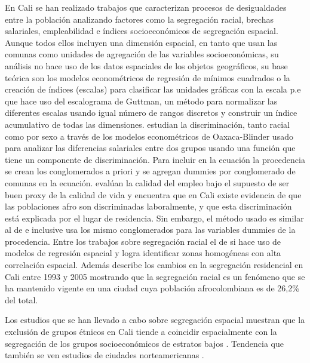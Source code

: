 \documentclass[12pt,]{book}
\begin{document}
En Cali se han realizado trabajos que caracterizan procesos de
desigualdades entre la población analizando factores como la segregación
racial, brechas salariales, empleabilidad e índices socioeconómicos de
segregación
espacial\citep{arroyo_mina_afrocolombianos_2016, mora_brechas_2014, ceron_indice_2014}.
Aunque todos ellos incluyen una dimensión espacial, en tanto que usan
las comunas como unidades de agregación de las variables
socioeconómicas, su análisis no hace uso de los datos espaciales de los
objetos geográficos, su base teórica son los modelos econométricos de
regresión de mínimos cuadrados o la creación de índices (escalas) para
clasificar las unidades gráficas con la escala p.e
\citep{ceron_indice_2014} que hace uso del escalograma de Guttman, un
método para normalizar las diferentes escalas usando igual número de
rangos discretos y construir un índice acumulativo de todas las
dimensiones. \citet{mora_brechas_2014} estudian la discriminación, tanto
racial como por sexo a través de los modelos econométricos de
Oaxaca-Blinder usado para analizar las diferencias salariales entre dos
grupos usando una función que tiene un componente de discriminación.
Para incluir en la ecuación la procedencia se crean los conglomerados a
priori y se agregan dummies por conglomerado de comunas en la ecuación.
\citet{arroyo_mina_afrocolombianos_2016} evalúan la calidad del empleo
bajo el supuesto de ser buen proxy de la calidad de vida y encuentra que
en Cali existe evidencia de que las poblaciones afro son discriminadas
laboralmente, y que esta discriminación está explicada por el lugar de
residencia. Sin embargo, el método usado es similar al de
\citep{mora_brechas_2014} e inclusive usa los mismo conglomerados para
las variables dummies de la procedencia. Entre los trabajos sobre
segregación racial el de \citep{PACHECO2013121} si hace uso de modelos
de regresión espacial y logra identificar zonas homogéneas con alta
correlación espacial. Además describe los cambios en la segregación
residencial en Cali entre 1993 y 2005 mostrando que la segregación
racial es un fenómeno que se ha mantenido vigente en una ciudad cuya
población afrocolombiana es de 26,2\% del total.

Los estudios que se han llevado a cabo sobre segregación espacial
muestran que la exclusión de grupos étnicos en Cali tiende a coincidir
espacialmente con la segregación de los grupos socioeconómicos de
estratos bajos \citep{ceron_indice_2014}. Tendencia que también se ven
estudios de ciudades norteamericanas
\citep{heynen_political_2006, landry_street_2009, zhou_social_2013, nesbitt_exploring_2016}.
\end{document}

